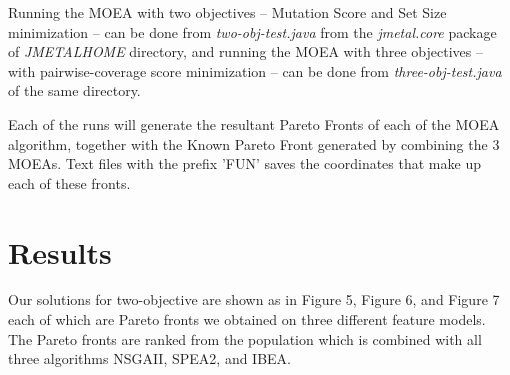 \documentclass[a4paper,12pt]{article}
\begin{document}
Running the MOEA with two objectives – Mutation Score and Set Size minimization – can be done from \emph{two-obj-test.java} from the \emph{jmetal.core} package of \emph{JMETALHOME} directory, and running the MOEA with three objectives – with pairwise-coverage score minimization – can be done from \emph{three-obj-test.java} of the same directory.

Each of the runs will generate the resultant Pareto Fronts of each of the MOEA algorithm, together with the Known Pareto Front generated by combining the 3 MOEAs. Text files with the prefix 'FUN' saves the coordinates that make up each of these fronts.



\section{Results}
Our solutions for two-objective are shown as in Figure 5, Figure 6, and Figure 7 each of which are Pareto fronts we obtained on three different feature models. The Pareto fronts are ranked from the population which is combined with all three algorithms NSGAII, SPEA2, and IBEA. 
\end{document}
